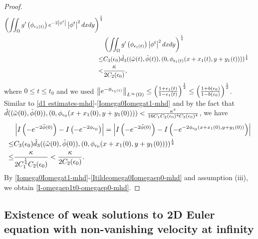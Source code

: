 \documentclass[1 [leqno, 11pt]{amsart}
\numberwithin{equation}{section}
\let\ep=\epsilon
\begin{document}
\begin{CJK*}{GBK}{song}
\begin{proof}
\begin{align}
\left(\iint_{\Omega}g'\left(\phi_{\ep_1(t)}\right)e^{-2\left|\phi^t\right|}\left|\phi^t\right|^2dxdy\right)^{1\over4}\\\nonumber
&\left(\iint_{\Omega}g'\left(\phi_{\ep_1(t)}\right)\left|\phi^t\right|^2dxdy\right)^{1\over4}\\\nonumber
\leq&C_3(\ep_0)\hat d_3((\tilde \omega(t),\tilde \phi(t)),( 0, \phi_{\ep_1(t)}(x+x_1(t),y+y_1(t))))^{1\over4}\\\label{Iomega0Iomegat1-mhd}
< &{\kappa\over2C_2(\ep_0)},
\end{align}
where $0\leq t\leq t_0$ and we used $\left\|e^{-\phi_{\ep_1(t)}}\right\|_{L^\infty(\Omega)}\leq  \left({1+\ep_1(t)\over 1-\ep_1(t)}\right)^{1\over2}\leq \left({1+b(\ep_0)\over 1-b(\ep_0)}\right)^{1\over2}$.
Similar to \eqref{d1 estimates-mhd}-\eqref{Iomega0Iomegat1-mhd} and by the fact that $\hat d((\tilde\omega(0),\tilde \phi(0)),(0,\phi_{\ep_0}(x+x_1(0),y+y_1(0))))<{\kappa^4\over16C_1C_2(\ep_0)^4C_3(\ep_0)^4}$, we have
\begin{align}\nonumber
&\left|I\left(-e^{-2\tilde \phi(0)}\right)-I\left(-e^{-2\phi_{\ep_0}}\right)\right|=\left|I\left(-e^{-2\tilde \phi(0)}\right)-I\left(-e^{-2\phi_{\ep_0}(x+x_1(0),y+y_1(0))}\right)\right|\\\nonumber
\leq& C_3(\ep_0)\hat d_3((\tilde \omega(0),\tilde \phi(0)),( 0, \phi_{\ep_0}(x+x_1(0),y+y_1(0))))^{1\over4}\\\label{Itildeomega0Iomegaep0-mhd}
\leq& {\kappa\over2C_1^{1\over4}C_2(\ep_0)}< {\kappa\over2C_2(\ep_0)}.
\end{align}
By  \eqref{Iomega0Iomegat1-mhd}-\eqref{Itildeomega0Iomegaep0-mhd} and assumption (iii), we obtain \eqref{I-omegaep1t0-omegaep0-mhd}.
\end{proof}
\begin{appendix}
\section{Existence of weak solutions to 2D Euler equation with non-vanishing velocity at infinity}


\end{appendix}
\end{CJK*}
\end{document}
